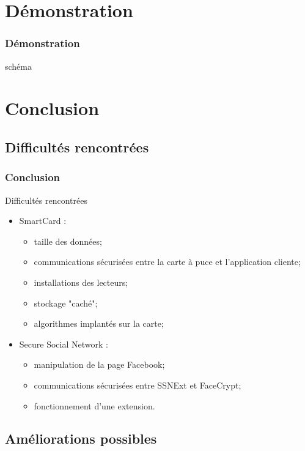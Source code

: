 \documentclass{beamer}
\begin{document}
\section{Démonstration}
\begin{frame}
    \frametitle{Démonstration}
    schéma
\end{frame}

\section{Conclusion}
\subsection{Difficultés rencontrées}
\begin{frame}
    \frametitle{Conclusion}
    \begin{alertblock}{Difficultés rencontrées}
        \begin{itemize}
            \item SmartCard : 
                \begin{itemize}
                    \item taille des données; %
                    \item communications sécurisées entre la carte à puce et l'application
                        cliente;
                    \item installations des lecteurs;
                    \item stockage "caché"; %
                    \item algorithmes implantés sur la carte;
                \end{itemize}
            \item Secure Social Network : 
                \begin{itemize}
                    \item manipulation de la page Facebook;
                    \item communications sécurisées entre SSNExt et FaceCrypt;
                    \item fonctionnement d'une extension.
                \end{itemize}
        \end{itemize}
    \end{alertblock}
\end{frame}

\subsection{Améliorations possibles}
\end{document}
